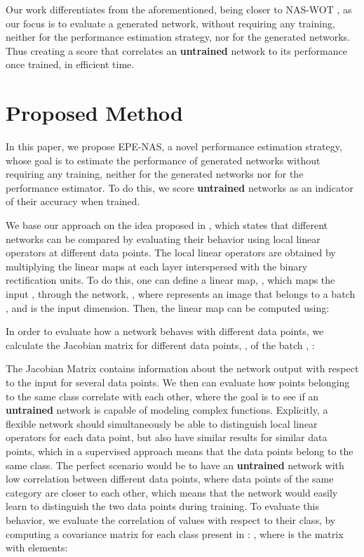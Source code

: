\documentclass[10pt, conference]{IEEEtran}
\begin{document}
Our work differentiates from the aforementioned, being closer to NAS-WOT \cite{mellor2020neural}, as our focus is to evaluate a generated network, without requiring any training, neither for the performance estimation strategy, nor for the generated networks. Thus creating a score that correlates an \textbf{untrained} network to its performance once trained, in efficient time.





\section{Proposed Method}
\label{proposed_method}
In this paper, we propose EPE-NAS, a novel performance estimation strategy, whose goal is to estimate the performance of generated networks without requiring any training, neither for the generated networks nor for the performance estimator. To do this, we score \textbf{untrained} networks as an indicator of their accuracy when trained.


We base our approach on the idea proposed in \cite{mellor2020neural}, which states that different networks can be compared by evaluating their behavior using local linear operators at different data points. The local linear operators are obtained by multiplying the linear maps at each layer interspersed with the binary rectification units. To do this, one can define a linear map, , which maps the input , through the network, , where  represents an image that belongs to a batch , and  is the input dimension. Then, the linear map can be computed using:




In order to evaluate how a network behaves with different data points, we calculate the Jacobian matrix  for different data points, , of the batch , :


The Jacobian Matrix  contains information about the network output with respect to the input for several data points. We then can evaluate how points belonging to the same class correlate with each other, where the goal is to see if an \textbf{untrained} network is capable of modeling complex functions. Explicitly, a flexible network should simultaneously be able to distinguish local linear operators for each data point, but also have similar results for similar data points, which in a supervised approach means that the data points belong to the same class. The perfect scenario would be to have an \textbf{untrained} network with low correlation between different data points, where data points of the same category are closer to each other, which means that the network would easily learn to distinguish the two data points during training. To evaluate this behavior, we evaluate the correlation of  values with respect to their class, by computing a covariance matrix for each class present in : , where  is the matrix with elements: 
\end{document}
